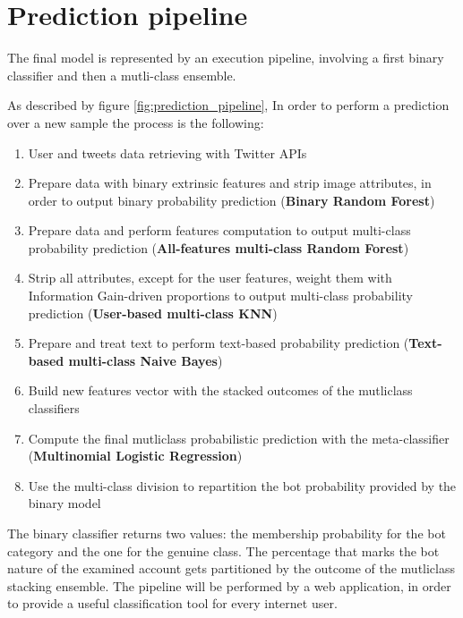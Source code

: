 \section{Prediction pipeline}
\label{predicion_pipeline}
The final model is represented by an execution pipeline, involving a first binary classifier and then a mutli-class ensemble.

As described by figure \ref{fig:prediction_pipeline}, In order to perform a prediction over a new sample the process is the following:
\begin{enumerate}
	\item User and tweets data retrieving with Twitter APIs
	\item Prepare data with binary extrinsic features and strip image attributes, in order to output binary probability prediction (\textbf{Binary Random Forest})
	\item Prepare data and perform features computation to output multi-class probability prediction (\textbf{All-features multi-class Random Forest})
	\item Strip all attributes, except for the user features, weight them with Information Gain-driven proportions to output multi-class probability prediction (\textbf{User-based multi-class KNN})
	\item Prepare and treat text to perform text-based probability prediction (\textbf{Text-based multi-class Naive Bayes})
	\item Build new features vector with the stacked outcomes of the mutliclass classifiers
	\item Compute the final mutliclass probabilistic prediction with the meta-classifier (\textbf{Multinomial Logistic Regression})
	\item Use the multi-class division to repartition the bot probability provided by the binary model
\end{enumerate}
The binary classifier returns two values: the membership probability for the bot category and the one for the genuine class.
The percentage that marks the bot nature of the examined account gets partitioned by the outcome of the mutliclass stacking ensemble.
The pipeline will be performed by a web application, in order to provide a useful classification tool for every internet user.

